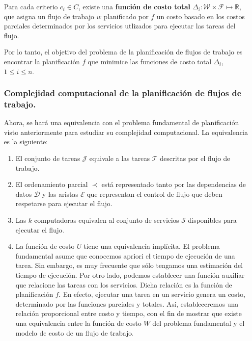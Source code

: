 \begin{defn}
Para cada criterio $c_i \in C$, existe una \textbf{función de costo total} $\Delta_i : \mathcal{W} \times \mathcal{F} \mapsto \mathbb{R}$, que asigna un flujo de trabajo $w$ planificado por $f$ un costo basado en los costos parciales determinados por los servicios utlizados para ejecutar las tareas del flujo.
\end{defn}

\noindent Por lo tanto, el objetivo del problema de la planificación de flujos de trabajo es encontrar la planificación $f$ que minimice las funciones de costo total $\Delta_i$, $1 \le i \le n$.

\subsubsection{Complejidad computacional de la planificación de flujos de trabajo.}
Ahora, se hará una equivalencia con el problema fundamental de planificación visto anteriormente para estudiar su complejidad computacional. La equivalencia es la siguiente:

\begin{enumerate}
\item El conjunto de tareas $\mathcal{J}$ equivale a las tareas $\mathcal{T}$ descritas por el flujo de trabajo.

\item El ordenamiento parcial $\prec$ está representado tanto por las dependencias de datos $\mathcal{D}$ y las aristas $\mathcal{E}$ que representan el control de flujo que deben respetarse para ejecutar el flujo.

\item Las $k$ computadoras equivalen al conjunto de servicios $\mathcal{S}$ disponibles para ejecutar el flujo.

\item La función de costo $U$ tiene una equivalencia implícita. El problema fundamental asume que conocemos apriori el tiempo de ejecución de una tarea. Sin embargo, es muy frecuente que sólo tengamos una estimación del tiempo de ejecución. Por otro lado, podemos establecer una función auxiliar que relacione las tareas con los servicios. Dicha relación es la función de planificación $f$. En efecto, ejecutar una tarea en un servicio genera un costo, determinado por las funciones parciales y totales. Así, estableceremos una relación proporcional entre costo y tiempo, con el fin de mostrar que existe una equivalencia entre la función de costo $W$ del problema fundamental y el modelo de costo de un flujo de trabajo.
\end{enumerate}


